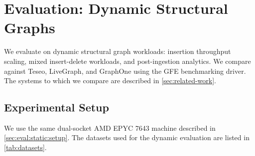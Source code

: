 \chapter{Evaluation: Dynamic Structural Graphs}
\label{sec:eval:dynamic:chapter}

We evaluate \project{} on dynamic structural graph workloads: insertion throughput scaling, mixed insert-delete workloads, and post-ingestion analytics.
We compare against Teseo, LiveGraph, and GraphOne using the GFE benchmarking driver.
The systems to which we compare are described in \autoref{sec:related-work}.

\section{Experimental Setup}
\label{sec:eval:dynamic:setup}

We use the same dual-socket AMD EPYC 7643 machine described in \autoref{sec:eval:static:setup}.
The datasets used for the dynamic evaluation are listed in \autoref{tab:datasets}.



